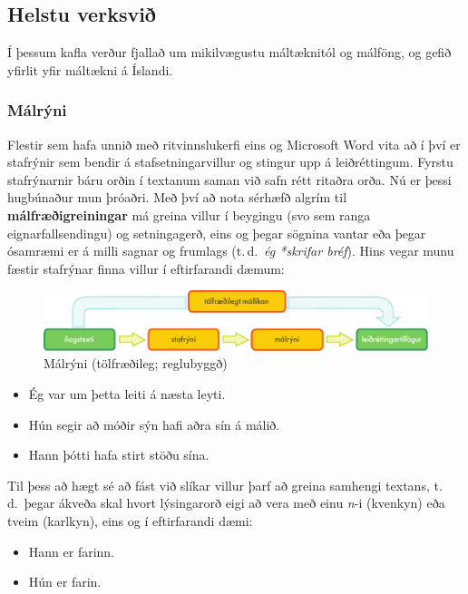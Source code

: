 \begin{multicols}{2}
\subsection{Helstu verksvið} 

Í þessum kafla verður fjallað um mikilvægustu máltæknitól og málföng, og gefið yfirlit yfir máltækni á Íslandi.

\subsubsection{Málrýni}

Flestir sem hafa unnið með ritvinnslukerfi eins og Microsoft Word vita að í því er stafrýnir sem bendir á stafsetningarvillur og stingur upp á leiðréttingum. Fyrstu stafrýnarnir báru orðin í textanum saman við safn rétt ritaðra orða. Nú er þessi hugbúnaður mun þróaðri. Með því að nota sérhæfð algrím til \textbf{málfræðigreiningar} má greina villur í beygingu (svo sem ranga eignarfallsendingu) og setningagerð, eins og þegar sögnina vantar eða þegar ósamræmi er á milli sagnar og frumlags (t.\,d.~\textit{ég *skrifar bréf}). Hins vegar munu fæstir stafrýnar finna villur í eftirfarandi dæmum:

\begin{figure}[t]
  \center
  \includegraphics[width=\textwidth]{../_media/icelandic/language_checking}
  \caption{Málrýni (tölfræðileg; reglubyggð)}
  \label{fig:langcheckingaarch_is}
\end{figure}

\begin{itemize}
\item Ég var um þetta leiti á næsta leyti.
\item Hún segir að móðir sýn hafi aðra sín á málið.
\item Hann þótti hafa stirt stöðu sína.
\end{itemize}

Til þess að hægt sé að fást við slíkar villur þarf að greina samhengi textans, t.\,d.~þegar ákveða skal hvort lýsingarorð eigi að vera með einu \textit{n}-i (kvenkyn) eða tveim (karlkyn), eins og í eftirfarandi dæmi:

\begin{itemize}
\item Hann er farinn.
\item Hún er farin.
\end{itemize}


\end{multicols}
